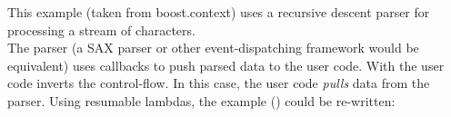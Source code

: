 \label{appendix}
This example (taken from boost.context\cite{bcontext}) uses a recursive descent
parser for processing a stream of characters.\\
The parser (a SAX parser or other event-dispatching framework would be
equivalent) uses callbacks to push parsed data to the user code. With \ectx the
user code inverts the control-flow. In this case, the user code \textit{pulls}
data from the parser.
Using resumable lambdas, the example () could be re-written:
